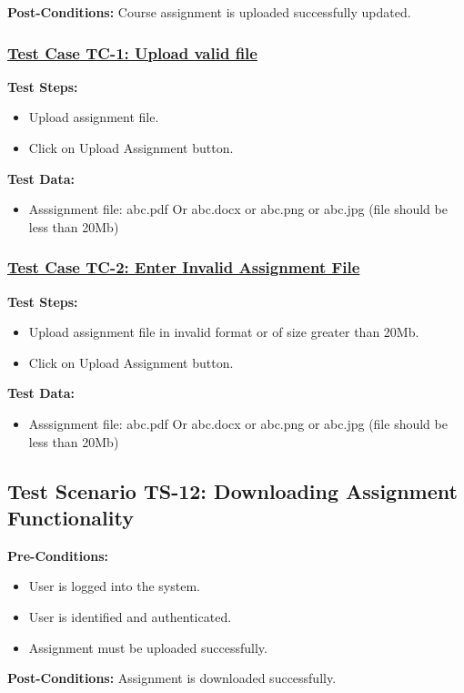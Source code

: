 \textbf{Post-Conditions: } Course assignment is uploaded successfully updated.
\subsubsection{\underline{Test Case TC-1: Upload valid file}}
\textbf{Test Steps:}
\begin{itemize}

\item Upload assignment file.
\item Click on Upload Assignment button.

\end{itemize}

\textbf{Test Data:}
\begin{itemize}

\item Asssignment file: abc.pdf Or abc.docx or abc.png or abc.jpg  (file should be less than 20Mb)


\end{itemize}

\subsubsection{\underline{Test Case TC-2: Enter Invalid Assignment File}}
\textbf{Test Steps:}
\begin{itemize}
\item Upload assignment file in invalid format or of size greater than 20Mb.
\item Click on Upload Assignment button.

\end{itemize}

\textbf{Test Data:}
\begin{itemize}

\item Asssignment file: abc.pdf Or abc.docx or abc.png or abc.jpg  (file should be less than 20Mb)

\end{itemize}

\subsection{Test Scenario TS-12: Downloading Assignment Functionality}
\textbf{Pre-Conditions: }
\begin{itemize}

\item User is logged into the system.
\item User is identified and authenticated.
\item Assignment must be uploaded successfully.

\end{itemize}
\textbf{Post-Conditions: } Assignment is downloaded successfully.

